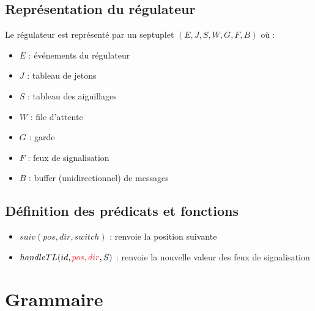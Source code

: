 \documentclass[12pt]{article}
\begin{document}
\subsection{Représentation du régulateur}
Le régulateur est représenté par un septuplet $(E, J, S, W, G, F, B)$ où :
\begin{itemize}
    \item $E$ : événements du régulateur
    \item $J$ : tableau de jetons
    \item $S$ : tableau des aiguillages
    \item $W$ : file d'attente
    \item $G$ : garde
    \item $F$ : feux de signalisation
    \item $B$ : buffer (unidirectionnel) de messages
\end{itemize}

\subsection{Définition des prédicats et fonctions}

\begin{itemize}
    \item $suiv(pos, dir, switch)$ : renvoie la position suivante 
    \item $handleTL(id, {\color{Red}pos, dir}, S)$ : renvoie la nouvelle valeur des feux de signalisation 
\end{itemize}


\section{Grammaire}



\begin{grammar}
    \otherform{\varepsilon }{}
\end{grammar}

\vspace{0.5cm}

\begin{grammar}
    \otherform{\varepsilon}{}

\end{grammar}
\end{document}
